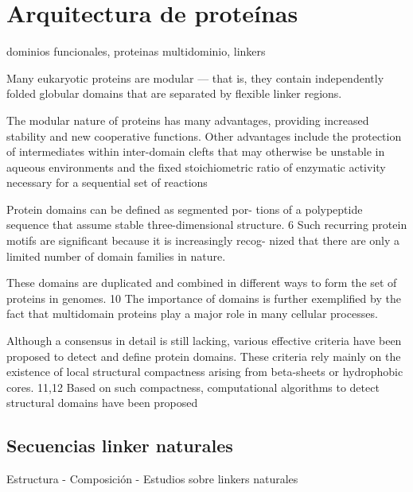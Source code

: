 \section{Arquitectura de proteínas}
dominios funcionales, proteinas multidominio, linkers 


Many eukaryotic proteins are modular — that is,
they contain independently folded globular domains
that are separated by flexible linker regions. 

The modular nature of proteins has many advantages,
providing increased stability and new cooperative functions.
Other advantages include the protection of intermediates within
inter-domain clefts that may otherwise be unstable in aqueous
environments and the fixed stoichiometric ratio of enzymatic
activity necessary for a sequential set of reactions


Protein domains can be defined as segmented por-
tions of a polypeptide sequence that assume stable
three-dimensional structure. 6 Such recurring protein
motifs are significant because it is increasingly recog-
nized that there are only a limited number of domain
families in nature.

These domains are duplicated and
combined in different ways to form the set of proteins
in genomes. 10 The importance of domains is further
exemplified by the fact that multidomain proteins
play a major role in many cellular processes.

Although a consensus in detail is still lacking, various
effective criteria have been proposed to detect and
define protein domains. These criteria rely mainly on
the existence of local structural compactness arising
from beta-sheets or hydrophobic cores. 11,12 Based on
such compactness, computational algorithms to detect
structural domains have been proposed








\subsection{Secuencias linker naturales}
Estructura - Composición -  Estudios sobre linkers naturales


